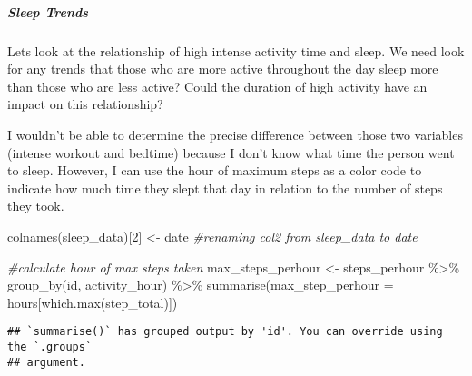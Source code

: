 \documentclass[
]{article}
\newenvironment{Shaded}{\begin{snugshade}}{\end{snugshade}}
\newcommand{\AttributeTok}[1]{\textcolor[rgb]{0.77,0.63,0.00}{#1}}
\newcommand{\CommentTok}[1]{\textcolor[rgb]{0.56,0.35,0.01}{\textit{#1}}}
\newcommand{\DecValTok}[1]{\textcolor[rgb]{0.00,0.00,0.81}{#1}}
\newcommand{\FunctionTok}[1]{\textcolor[rgb]{0.00,0.00,0.00}{#1}}
\newcommand{\NormalTok}[1]{#1}
\newcommand{\OtherTok}[1]{\textcolor[rgb]{0.56,0.35,0.01}{#1}}
\newcommand{\SpecialCharTok}[1]{\textcolor[rgb]{0.00,0.00,0.00}{#1}}
\newcommand{\StringTok}[1]{\textcolor[rgb]{0.31,0.60,0.02}{#1}}
\begin{document}
\hypertarget{sleep-trends}{%
\subparagraph{\texorpdfstring{\textbf{Sleep
Trends}}{Sleep Trends}}\label{sleep-trends}}

Lets look at the relationship of high intense activity time and sleep.
We need look for any trends that those who are more active throughout
the day sleep more than those who are less active? Could the duration of
high activity have an impact on this relationship?

I wouldn't be able to determine the precise difference between those two
variables (intense workout and bedtime) because I don't know what time
the person went to sleep. However, I can use the hour of maximum steps
as a color code to indicate how much time they slept that day in
relation to the number of steps they took.

\begin{Shaded}
\begin{Highlighting}[]
  \FunctionTok{colnames}\NormalTok{(sleep\_data)[}\DecValTok{2}\NormalTok{] }\OtherTok{\textless{}{-}} \StringTok{\textquotesingle{}date\textquotesingle{}} \CommentTok{\#renaming col2 from sleep\_data to date}

 \CommentTok{\#calculate hour of max steps taken}
\NormalTok{ max\_steps\_perhour }\OtherTok{\textless{}{-}}\NormalTok{ steps\_perhour }\SpecialCharTok{\%\textgreater{}\%}
   \FunctionTok{group\_by}\NormalTok{(id, activity\_hour) }\SpecialCharTok{\%\textgreater{}\%}
   \FunctionTok{summarise}\NormalTok{(}\AttributeTok{max\_step\_perhour =}\NormalTok{ hours[}\FunctionTok{which.max}\NormalTok{(step\_total)])}
\end{Highlighting}
\end{Shaded}

\begin{verbatim}
## `summarise()` has grouped output by 'id'. You can override using the `.groups`
## argument.
\end{verbatim}
\end{document}
